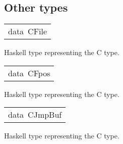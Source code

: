 \subsection{Other types
}
\begin{haddockdesc}
\item[\begin{tabular}{@{}l}
data\ CFile
\end{tabular}]\haddockbegindoc
Haskell type representing the C  type.
\par

\end{haddockdesc}
\begin{haddockdesc}
\item[\begin{tabular}{@{}l}
data\ CFpos
\end{tabular}]\haddockbegindoc
Haskell type representing the C  type.
\par

\end{haddockdesc}
\begin{haddockdesc}
\item[\begin{tabular}{@{}l}
data\ CJmpBuf
\end{tabular}]\haddockbegindoc
Haskell type representing the C  type.
\par

\end{haddockdesc}